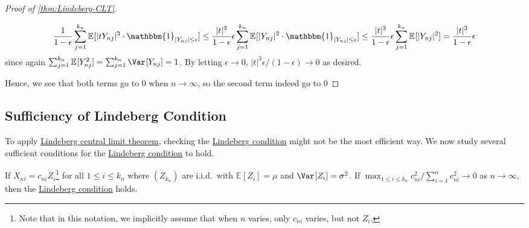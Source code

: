 \begin{proof}[Proof of \autoref{thm:Lindeberg-CLT}]
\begin{itemize}
		      \[
			      \frac{1}{1 - \epsilon } \sum_{j=1}^{k_n} \mathbb{E}_{}[\vert t Y_{nj} \vert ^3 \cdot \mathbbm{1}_{\vert Y_{nj} \vert \leq \epsilon } ]
			      \leq \frac{\vert t \vert ^3}{1 - \epsilon } \epsilon \sum_{j=1}^{k_n} \mathbb{E}_{}[\vert Y_{nj} \vert ^2 \cdot \mathbbm{1}_{\vert Y_{nj} \vert \leq \epsilon } ]
			      \leq \frac{\vert t \vert ^3}{1 - \epsilon } \epsilon \sum_{j=1}^{k_n} \mathbb{E}_{}[\vert Y_{nj} \vert ^2 ]
			      = \frac{\vert t \vert ^3}{1 - \epsilon } \epsilon
		      \]
		      since again \(\sum_{j=1}^{k_n} \mathbb{E}_{}[Y_{nj}^2] = \sum_{j=1}^{k_n} \Var_{}[Y_{nj}] = 1\). By letting \(\epsilon \to 0\), \(\vert t \vert ^3 \epsilon / (1 - \epsilon ) \to 0\) as desired.
	\end{itemize}
	Hence, we see that both terms go to \(0\) when \(n \to \infty \), so the second term indeed go to \(0\)
\end{proof}

\subsection{Sufficiency of Lindeberg Condition}
To apply \hyperref[thm:Lindeberg-CLT]{Lindeberg central limit theorem}, checking the \hyperref[def:Lindeberg-condition]{Lindeberg condition} might not be the most efficient way. We now study several sufficient conditions for the \hyperref[def:Lindeberg-condition]{Lindeberg condition} to hold.

\begin{corollary}\label{thm:Hajek-Sidak-CLT}
	If \(X_{ni} = c_{ni} Z_i\)\footnote{Note that in this notation, we implicitly assume that when \(n\) varies, only \(c_{ni}\) varies, but not \(Z_i\).} for all \(1 \leq i \leq k_n\) where \((Z_{k_n})\) are i.i.d.\ with \(\mathbb{E}_{}[Z_i] = \mu \) and \(\Var_{}[Z_i] = \sigma ^2\). If \(\max _{1 \leq i \leq k_n} c_{ni}^2 / \sum_{i=1}^{n} c_{ni}^2 \to 0\) as \(n \to \infty \), then the \hyperref[def:Lindeberg-condition]{Lindeberg condition} holds.
\end{corollary}
